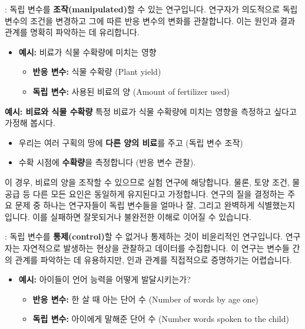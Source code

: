 \documentclass[11pt,a4paper]{article}
\theoremstyle{definition}
\begin{document}
\begin{tcolorbox}[infobox, title={연구의 유형 (1/2): 실험 연구 (Experimental Study)}]
: 독립 변수를 \textbf{조작(manipulated)}할 수 있는 연구입니다. 연구자가 의도적으로 독립 변수의 조건을 변경하고 그에 따른 반응 변수의 변화를 관찰합니다. 이는 원인과 결과 관계를 명확히 파악하는 데 유리합니다.
\begin{itemize}
    \item \textbf{예시:} 비료가 식물 수확량에 미치는 영향
    \begin{itemize}
        \item \textbf{반응 변수:} 식물 수확량 (Plant yield)
        \item \textbf{독립 변수:} 사용된 비료의 양 (Amount of fertilizer used)
    \end{itemize}
\end{itemize}
\end{tcolorbox}

\begin{examplebox}
\textbf{예시: 비료와 식물 수확량}
특정 비료가 식물 수확량에 미치는 영향을 측정하고 싶다고 가정해 봅시다.
\begin{itemize}
    \item 우리는 여러 구획의 땅에 \textbf{다른 양의 비료}를 주고 (독립 변수 조작)
    \item 수확 시점에 \textbf{수확량}을 측정합니다 (반응 변수 관찰).
\end{itemize}
이 경우, 비료의 양을 조작할 수 있으므로 실험 연구에 해당합니다. 물론, 토양 조건, 물 공급 등 다른 모든 요인은 동일하게 유지된다고 가정합니다. 연구의 질을 결정하는 주요 문제 중 하나는 연구자들이 독립 변수들을 얼마나 잘, 그리고 완벽하게 식별했는지입니다. 이를 실패하면 잘못되거나 불완전한 이해로 이어질 수 있습니다.
\end{examplebox}

\begin{tcolorbox}[infobox, title={연구의 유형 (2/2): 관찰 연구 (Observational Study)}]
: 독립 변수를 \textbf{통제(control)}할 수 없거나 통제하는 것이 비윤리적인 연구입니다. 연구자는 자연적으로 발생하는 현상을 관찰하고 데이터를 수집합니다. 이 연구는 변수들 간의 관계를 파악하는 데 유용하지만, 인과 관계를 직접적으로 증명하기는 어렵습니다.
\begin{itemize}
    \item \textbf{예시:} 아이들이 언어 능력을 어떻게 발달시키는가?
    \begin{itemize}
        \item \textbf{반응 변수:} 한 살 때 아는 단어 수 (Number of words by age one)
        \item \textbf{독립 변수:} 아이에게 말해준 단어 수 (Number words spoken to the child)
    \end{itemize}
\end{itemize}
\end{tcolorbox}
\end{document}
